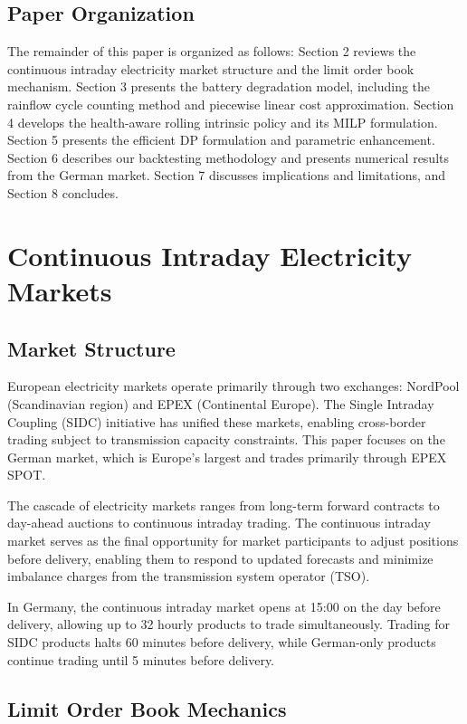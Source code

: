 \documentclass[10pt,twocolumn]{article}
\begin{document}
\subsection{Paper Organization}

The remainder of this paper is organized as follows: Section 2 reviews the continuous intraday electricity market structure and the limit order book mechanism. Section 3 presents the battery degradation model, including the rainflow cycle counting method and piecewise linear cost approximation. Section 4 develops the health-aware rolling intrinsic policy and its MILP formulation. Section 5 presents the efficient DP formulation and parametric enhancement. Section 6 describes our backtesting methodology and presents numerical results from the German market. Section 7 discusses implications and limitations, and Section 8 concludes.

\section{Continuous Intraday Electricity Markets}

\subsection{Market Structure}

European electricity markets operate primarily through two exchanges: NordPool (Scandinavian region) and EPEX (Continental Europe). The Single Intraday Coupling (SIDC) initiative has unified these markets, enabling cross-border trading subject to transmission capacity constraints. This paper focuses on the German market, which is Europe's largest and trades primarily through EPEX SPOT.

The cascade of electricity markets ranges from long-term forward contracts to day-ahead auctions to continuous intraday trading. The continuous intraday market serves as the final opportunity for market participants to adjust positions before delivery, enabling them to respond to updated forecasts and minimize imbalance charges from the transmission system operator (TSO).

In Germany, the continuous intraday market opens at 15:00 on the day before delivery, allowing up to 32 hourly products to trade simultaneously. Trading for SIDC products halts 60 minutes before delivery, while German-only products continue trading until 5 minutes before delivery.

\subsection{Limit Order Book Mechanics}
\end{document}
